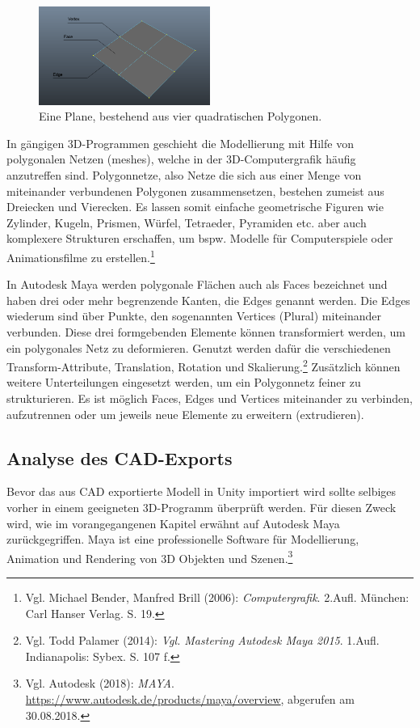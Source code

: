 \begin{figure}
	\centering
	\includegraphics[width=0.5\textwidth]{bildquellen/face_edge_vertex}
	\caption{Eine Plane, bestehend aus vier quadratischen Polygonen.}
\end{figure}
In gängigen 3D-Programmen geschieht die Modellierung mit Hilfe von polygonalen Netzen (meshes), welche in der 3D-Computergrafik häufig anzutreffen sind. Polygonnetze, also Netze die sich aus einer Menge von miteinander verbundenen Polygonen zusammensetzen, bestehen zumeist aus Dreiecken und Vierecken. Es lassen somit einfache geometrische Figuren wie Zylinder, Kugeln, Prismen, Würfel, Tetraeder, Pyramiden etc. aber auch komplexere Strukturen erschaffen, um bspw. Modelle für Computerspiele oder Animationsfilme zu erstellen.\footnote{Vgl. Michael Bender, Manfred Brill (2006): \textit{Computergrafik}. 2.Aufl. München: \newline Carl Hanser Verlag. S. 19.}

In Autodesk Maya werden polygonale Flächen auch als Faces bezeichnet und haben drei oder mehr begrenzende Kanten, die Edges genannt werden. Die Edges wiederum sind über Punkte, den sogenannten Vertices (Plural) miteinander verbunden. Diese drei formgebenden Elemente können transformiert werden, um ein polygonales Netz zu deformieren. Genutzt werden dafür die verschiedenen Transform-Attribute, Translation, Rotation und Skalierung.\footnote{Vgl. Todd Palamer (2014): \textit{Vgl. Mastering Autodesk Maya 2015}. 1.Aufl. Indianapolis: Sybex. S. 107 f.} Zusätzlich können weitere Unterteilungen eingesetzt werden, um ein Polygonnetz feiner zu strukturieren. Es ist möglich Faces, Edges und Vertices miteinander zu verbinden, aufzutrennen oder um jeweils neue Elemente zu erweitern (extrudieren). 

\clearpage

\subsection{Analyse des CAD-Exports}
\label{subsec:AnalyseDesCAD-Exports}
Bevor das aus CAD exportierte Modell in Unity importiert wird sollte selbiges vorher in einem geeigneten 3D-Programm überprüft werden. Für diesen Zweck wird, wie im vorangegangenen Kapitel erwähnt auf Autodesk Maya zurückgegriffen. Maya ist eine professionelle Software für Modellierung, Animation und Rendering von 3D Objekten und Szenen.\footnote{Vgl. Autodesk  (2018): \textit{MAYA}.\newline
\url{https://www.autodesk.de/products/maya/overview},\newline 
abgerufen am 30.08.2018.}

